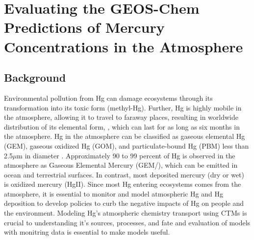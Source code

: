 \chapter{Evaluating the GEOS-Chem Predictions of Mercury Concentrations in the Atmosphere }
\section{Background}


\begin{flushleft}
Environmental pollution from Hg can damage ecosystems through its transformation into its toxic form (methyl-Hg). Further, Hg is highly mobile in the atmosphere, allowing it to travel to faraway places, resulting in worldwide distribution of its elemental form, \hg, which can last for as long as six months in the atmosphere\cite{horowitz_new_2017,shah_improved_2021}. Hg in the atmosphere can be classified as gaseous elemental Hg (GEM), gaseous oxidized Hg (GOM), and particulate-bound Hg (PBM) less than 2.5$\mu$m in diameter \cite{lindberg_synthesis_2007,schroeder_atmospheric_1998,landis_development_2002}. Approximately 90 to 99 percent of Hg is observed in the atmosphere as Gaseous Elemental Mercury (GEM/\hg), which can be emitted in ocean and terrestrial surfaces. In contrast, most deposited mercury (dry or wet) is oxidized mercury (HgII). Since most Hg entering ecosystems comes from the atmosphere, it is essential to monitor and model atmospheric Hg and Hg deposition to develop policies to curb the negative impacts of Hg on people and the environment. Modeling Hg's atmospheric chemistry transport using CTMs is crucial to understanding it's sources, processes, and fate and evaluation of models with monitring data is essential to make models useful.  
\end{flushleft}

